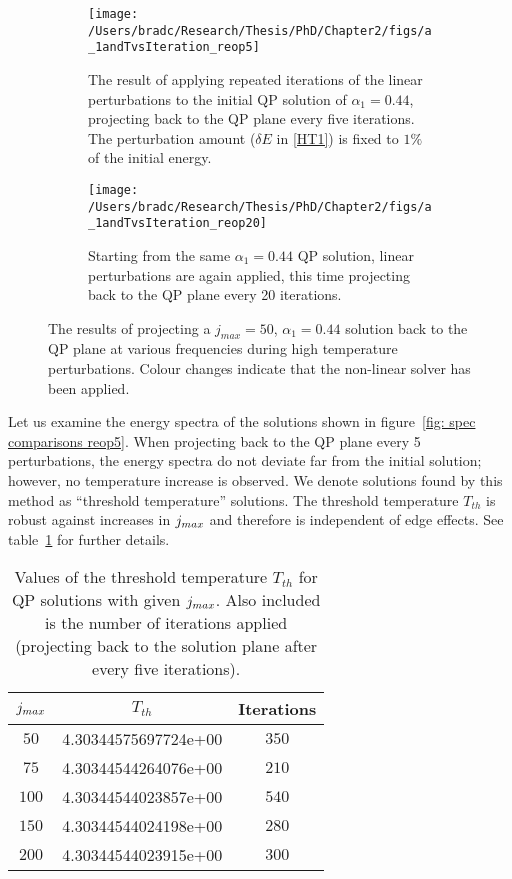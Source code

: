 \documentclass[../PhD.tex]{subfiles}
\begin{document}
\begin{figure}[h]
	\centering
	\begin{subfigure}[t]{0.45\textwidth}
		\texttt{[image: /Users/bradc/Research/Thesis/PhD/Chapter2/figs/a\_1andTvsIteration\_reop5]}
		\caption{The result of applying repeated iterations of the linear perturbations to the initial QP solution of $\alpha_1=0.44$, projecting back to the QP plane every five iterations. The perturbation amount ($\delta E$ in \eqref{HT1}) is fixed to $1\%$ of the initial energy.}
		\label{fig: a_1andTa0.2reop5}
	\end{subfigure}
	\:
	\begin{subfigure}[t]{0.45\textwidth}
		\texttt{[image: /Users/bradc/Research/Thesis/PhD/Chapter2/figs/a\_1andTvsIteration\_reop20]}
		\caption{Starting from the same $\alpha_1=0.44$ QP solution, linear perturbations are again applied, this time projecting back to the QP plane every 20 iterations.}
		\label{fig: a_1andTa.2reop20}
	\end{subfigure}
	\caption{The results of projecting a $j_{max}=50$, $\alpha_1 = 0.44$ solution back to the QP plane at various frequencies during high temperature perturbations. Colour changes indicate that the non-linear solver has been applied.}
	\label{fig: reop comparisons}
\end{figure}

Let us examine the energy spectra of the solutions shown in figure~\ref{fig: spec comparisons reop5}. When projecting back to the QP plane every 5 perturbations, the energy spectra do not deviate far from the initial solution; however, no temperature increase is observed. We denote solutions found by this method as ``threshold temperature'' solutions. The threshold temperature $T_{th}$ is robust against increases in $j_{max}$ and therefore is independent of edge effects. See table~\ref{tab: T_thresh} for further details.

\begin{table}
	\centering
	\begin{tabular}[t]{|c|c|c|}
		\hline
		$j_{max}$ & $T_{th}$ & Iterations \\ \hline
		$50$ & 4.30344575697724e+00 & $350$ \\ \hline
		$75$ & 4.30344544264076e+00 & $210$ \\ \hline
		$100$ & 4.30344544023857e+00 & $540$ \\ \hline
		$150$ & 4.30344544024198e+00 & $280$ \\ \hline
		$200$ & 4.30344544023915e+00 & $300$ \\ \hline
	\end{tabular}
	\caption{Values of the threshold temperature $T_{th}$ for QP solutions with given $j_{max}$. Also included is the number of iterations applied (projecting back to the solution plane after every five iterations).}
	\label{tab: T_thresh}
\end{table}
\end{document}
